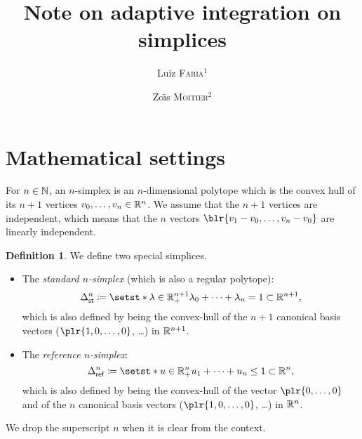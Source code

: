 \documentclass[english,12pt]{article}
\title{Note on adaptive integration on simplices}
\author{
    Luiz \textsc{Faria}\({}^1\)
    \and
    Zo{\"\i}s \textsc{Moitier}\({}^2\)
}
\date{\raggedright\footnotesize%
    \({^1}\)POEMS, CNRS, Inria, ENSTA Paris, Institut Polytechnique de Paris, 91120 Palaiseau, France.\\
    \({}^2\)IDEFIX, Inria, ENSTA Paris, Institut Polytechnique de Paris, 91120 Palaiseau, France.\\[1em]
    \large\Red{\textbf{\today}}
}
\numberwithin{equation}{section}
\DeclarePairedDelimiter{\plr}\lparen\rparen%
\DeclarePairedDelimiter{\blr}\lbrace\rbrace%
\theoremstyle{definition}
\newtheorem{definition}{Definition}[section]
\theoremstyle{plain}
\theoremstyle{remark}
\begin{document}
\maketitle




\section{Mathematical settings}

For \( n  \in \mathbb{N} \), an \( n \)-simplex is an \( n \)-dimensional polytope which is the convex hull of its \( n+1 \) vertices \( v_0, \ldots, v_n \in \mathbb{R}^n \).
We assume that the \( n+1 \) vertices are independent, which means that the \( n \) vectors \( \blr{v_1 - v_0, \ldots, v_n - v_0} \) are linearly independent.

\begin{definition}
    We define two special simplices.
    \begin{itemize}
        \item The \emph{standard \( n \)-simplex} (which is also a regular polytope):
              \[
                  \Simplex_\St^n \coloneqq \setst*{\lambda \in \bbR_+^{n+1}}{\lambda_0 + \cdots + \lambda_n = 1} \subset \bbR^{n+1},
              \]
              which is also defined by being the convex-hull of the \( n+1 \) canonical basis vectors (\( \plr{1,0,\ldots, 0} \), \ldots) in \( \mathbb{R}^{n+1} \).

        \item The \emph{reference \( n \)-simplex}:
              \[
                  \Simplex_\Rf^n \coloneqq \setst*{u \in \bbR_+^n}{u_1 + \cdots + u_n \leq 1} \subset \bbR^n,
              \]
              which is also defined by being the convex-hull of the vector \( \plr{0, \ldots, 0} \) and of the \( n \) canonical basis vectors (\( \plr{1,0,\ldots, 0} \), \ldots) in \( \mathbb{R}^n \).
    \end{itemize}
    We drop the superscript \( n \) when it is clear from the context.
\end{definition}
\end{document}
